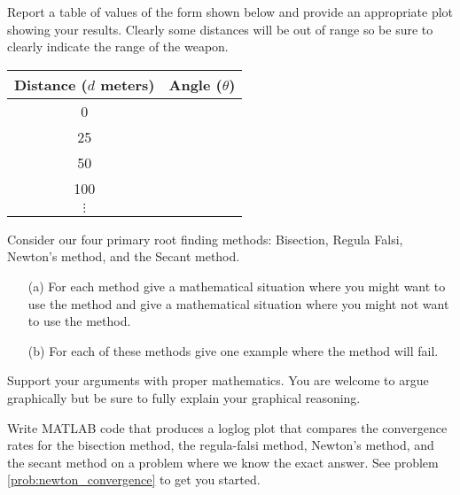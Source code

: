 \begin{problem}
\begin{enumerate}
            Report a table of values of the form shown below and provide an appropriate
            plot showing your results.  Clearly some distances will be out of range so be
            sure to clearly indicate the range of the weapon.
            \begin{center}
                \begin{tabular}{|c|c|}
                    \hline
                    Distance ($d$ meters) & Angle ($\theta$) \\ \hline \hline
                    0 & \\
                    25 & \\
                    50 & \\
                    100 & \\
                    $\vdots$ & \\ \hline
                \end{tabular}
            \end{center}
    \end{enumerate}
\end{problem}


\begin{problem}
    Consider our four primary root finding methods: Bisection, Regula Falsi, Newton's method, and the
    Secant method.  
    \begin{enumerate}
        \item[(a)] For each method give a mathematical situation where you might want to
            use the method and give a mathematical situation where you might not want to
            use the method.  
        \item[(b)] For each of these methods give one example where the method will fail.  
        \end{enumerate}
        Support your arguments with proper mathematics.  You are welcome to argue
        graphically but be sure to fully explain your graphical reasoning.
\end{problem}


\begin{problem}
    Write MATLAB code that produces a loglog plot that compares the convergence rates for
    the bisection method, the regula-falsi method, Newton's method, and the secant method
    on a problem where we know the exact answer. See problem \ref{prob:newton_convergence}
    to get you started.
\end{problem}


